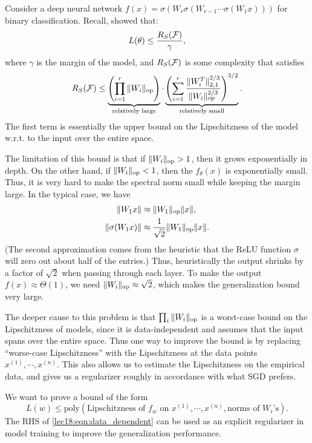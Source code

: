 Consider a deep neural network $f(x) = \sigma(W_r\sigma(W_{r-1}\cdots \sigma(W_1x)))$ for binary classification. Recall, \cite{bartlett2017} showed that:
\begin{equation}
L(\theta) \leq \frac{R_S (\mathcal F) }{\gamma},
\end{equation}
where $\gamma$ is the margin of the model, and $R_S (\mathcal F)$ is some complexity that satisfies
\begin{equation}
R_S (\mathcal F) \leq \underbrace{\left(\prod_{i=1}^r\|W_i\|_{\textup{op}} \right)}_{\text{relatively large}} \cdot \underbrace{\left( \sum_{i=1}^r\frac{\|W_i^T\|^{2/3}_{2,1}}{\|W_i\|_{\textup{op}}^{2/3}}\right)^{3/2}}_{\text{relatively small}}.
\end{equation}
The first term is essentially the upper bound on the Lipschitzness of the model w.r.t. to the input over the entire space. 

The limitation of this bound is that if $\|W_i\|_{\textup{op}} >1$, then it grows exponentially in depth. On the other hand, if $\|W_i\|_{\textup{op}} < 1$, then the $f_\theta(x)$ is exponentially small. Thus, it is very hard to make the spectral norm small while keeping the margin large. In the typical case, we have
\begin{align}
    \|W_1x\| &\approx \|W_1\|_{\textup{op}}\|x\|, \\
    \|\sigma(W_1x)\| &\approx \frac{1}{\sqrt{2}}\|W_1\|_{\textup{op}}\|x\|.
\end{align}
(The second approximation comes from the heuristic that the ReLU function $\sigma$ will zero out about half of the entries.) Thus, heuristically the output shrinks by a factor of $\sqrt{2}$ when passing through each layer. To make the output $f(x)\approx \Theta(1)$, we need $\|W_i\|_{\textup{op}}\approx \sqrt{2}$, which makes the generalization bound very large. 

The deeper cause to this problem is that $\prod_i \|W_i\|_{\textup{op}}$ is a worst-case bound on the Lipschitzness of models, since it is data-independent and assumes that the input spans over the entire space. Thus one way to improve the bound is by replacing ``worse-case Lipschitzness'' with the Lipschitzness at the data points $x^{(1)}, \cdots, x^{(n)}$. This also allows us to estimate the Lipschitzness on the empirical data, and gives us a regularizer roughly in accordance with what SGD prefers.

We want to prove a bound of the form
\begin{equation}\label{lec18:eqn:data_dependent}
L(w)\leq \text{poly}(\text{Lipschitzness of $f_w$ on $x^{(1)}, \cdots, x^{(n)}$}, \text{norms of $W_i$'s}).
\end{equation}
The RHS of \eqref{lec18:eqn:data_dependent} can be used as an explicit regularizer in model training to improve the generalization performance. 

